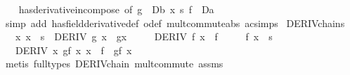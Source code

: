 \begin{isabellebody}
%
\isadelimproof
\ \ %
\endisadelimproof
%
\isatagproof
{}\isamarkupfalse%
\ has{\isacharunderscore}{\kern0pt}derivative{\isacharunderscore}{\kern0pt}in{\isacharunderscore}{\kern0pt}compose\ {\isacharbrackleft}{\kern0pt}of\ g\ {\isachardoublequoteopen}{\isacharparenleft}{\kern0pt}{\isacharasterisk}{\kern0pt}{\isacharparenright}{\kern0pt}\ Db{\isachardoublequoteclose}\ x\ s\ f\ {\isachardoublequoteopen}{\isacharparenleft}{\kern0pt}{\isacharasterisk}{\kern0pt}{\isacharparenright}{\kern0pt}\ Da\ {\isachardoublequoteclose}{\isacharbrackright}{\kern0pt}\isanewline
\ \ \isamarkupfalse%
\ {\isacharparenleft}{\kern0pt}simp\ add{\isacharcolon}{\kern0pt}\ has{\isacharunderscore}{\kern0pt}field{\isacharunderscore}{\kern0pt}derivative{\isacharunderscore}{\kern0pt}def\ o{\isacharunderscore}{\kern0pt}def\ mult{\isacharunderscore}{\kern0pt}commute{\isacharunderscore}{\kern0pt}abs\ ac{\isacharunderscore}{\kern0pt}simps{\isacharparenright}{\kern0pt}%
\endisatagproof
{\isafoldproof}%
%
\isadelimproof
\isanewline
%
\endisadelimproof
\isanewline
\isanewline
{}\isamarkupfalse%
\ DERIV{\isacharunderscore}{\kern0pt}chain{\isacharunderscore}{\kern0pt}s{\isacharcolon}{\kern0pt}\isanewline
\ \ \ {\isachardoublequoteopen}{\isacharparenleft}{\kern0pt}{\isasymAnd}x{\isachardot}{\kern0pt}\ x\ {\isasymin}\ s\ {\isasymLongrightarrow}\ DERIV\ g\ x\ {\isacharcolon}{\kern0pt}{\isachargreater}{\kern0pt}\ g{\isacharprime}{\kern0pt}{\isacharparenleft}{\kern0pt}x{\isacharparenright}{\kern0pt}{\isacharparenright}{\kern0pt}{\isachardoublequoteclose}\isanewline
\ \ \ \ \ {\isachardoublequoteopen}DERIV\ f\ x\ {\isacharcolon}{\kern0pt}{\isachargreater}{\kern0pt}\ f{\isacharprime}{\kern0pt}{\isachardoublequoteclose}\isanewline
\ \ \ \ \ {\isachardoublequoteopen}f\ x\ {\isasymin}\ s{\isachardoublequoteclose}\isanewline
\ \ \ {\isachardoublequoteopen}DERIV\ {\isacharparenleft}{\kern0pt}{\isasymlambda}x{\isachardot}{\kern0pt}\ g{\isacharparenleft}{\kern0pt}f\ x{\isacharparenright}{\kern0pt}{\isacharparenright}{\kern0pt}\ x\ {\isacharcolon}{\kern0pt}{\isachargreater}{\kern0pt}\ f{\isacharprime}{\kern0pt}\ {\isacharasterisk}{\kern0pt}\ g{\isacharprime}{\kern0pt}{\isacharparenleft}{\kern0pt}f\ x{\isacharparenright}{\kern0pt}{\isachardoublequoteclose}\isanewline
%
\isadelimproof
\ \ %
\endisadelimproof
%
\isatagproof
{}\isamarkupfalse%
\ {\isacharparenleft}{\kern0pt}metis\ {\isacharparenleft}{\kern0pt}full{\isacharunderscore}{\kern0pt}types{\isacharparenright}{\kern0pt}\ DERIV{\isacharunderscore}{\kern0pt}chain{\isacharprime}{\kern0pt}\ mult{\isachardot}{\kern0pt}commute\ assms{\isacharparenright}{\kern0pt}%

\end{isabellebody}
